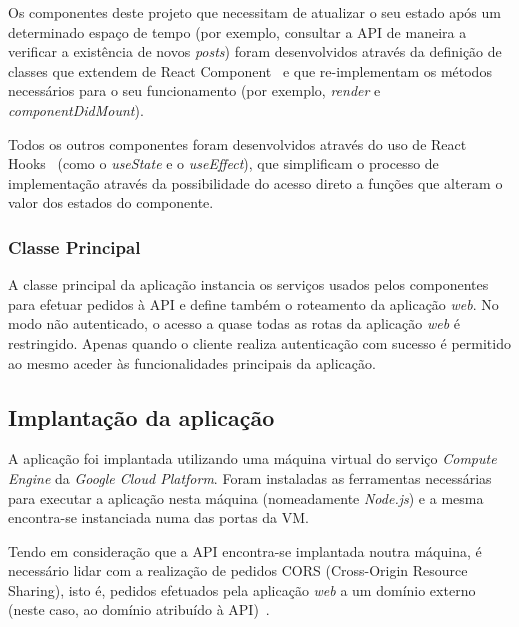 Os componentes deste projeto que necessitam de atualizar o seu estado após um determinado espaço de tempo (por exemplo, consultar a API de maneira a verificar a existência de novos \textit{posts}) foram desenvolvidos através da definição de classes que extendem de React Component~\cite{ReactJS2020} e que re-implementam os métodos necessários para o seu funcionamento (por exemplo, \textit{render} e \textit{componentDidMount}).

\medskip

Todos os outros componentes foram desenvolvidos através do uso de React Hooks~\cite{ReactJS2019} (como o \textit{useState} e o \textit{useEffect}), que simplificam o processo de implementação através da possibilidade do acesso direto a funções que alteram o valor dos estados do componente.

\subsubsection{Classe Principal}

A classe principal da aplicação instancia os serviços usados pelos componentes para efetuar pedidos à API e define também o roteamento da aplicação \textit{web}. No modo não autenticado, o acesso a quase todas as rotas da aplicação \textit{web} é restringido. Apenas quando o cliente realiza autenticação com sucesso é permitido ao mesmo aceder às funcionalidades principais da aplicação.

\subsection{Implantação da aplicação}

A aplicação foi implantada utilizando uma máquina virtual do serviço \textit{Compute Engine} da \textit{Google Cloud Platform}. Foram instaladas as ferramentas necessárias para executar a aplicação nesta máquina (nomeadamente \textit{Node.js}) e a mesma encontra-se instanciada numa das portas da VM. 

\par \medskip

Tendo em consideração que a API encontra-se implantada noutra máquina, é necessário lidar com a realização de pedidos CORS (Cross-Origin Resource Sharing), isto é, pedidos efetuados pela aplicação \textit{web} a um domínio externo (neste caso, ao domínio atribuído à API)~\cite{MDN2019}. 

\par \medskip

